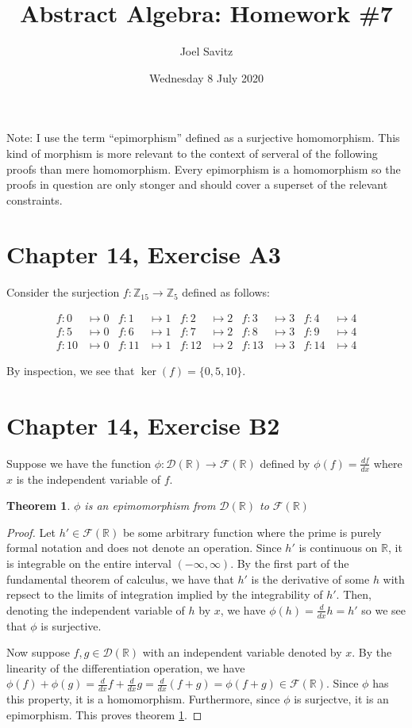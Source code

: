 \documentclass[12pt]{article}
\title{Abstract Algebra: Homework \#7}
\author{Joel Savitz}
\date{Wednesday 8 July 2020}
\newcommand{\reals}{\mathbb{R}}
\newcommand{\ints}{\mathbb{Z}}
\newcommand{\freals}{\mathcal{F}(\reals)}
\newcommand{\dreals}{\mathcal{D}(\reals)}
\newtheorem{thm}{Theorem}
\begin{document}
\maketitle

Note: I use the term ``epimorphism'' defined as a surjective homomorphism.
This kind of morphism is more relevant to the context of serveral of
the following proofs than mere homomorphism.
Every epimorphism is a homomorphism
so the proofs in question are only stonger
and should cover a superset of the relevant constraints.

\section{Chapter 14, Exercise A3}

Consider the surjection $f:\ints_{15} \to \ints_5$ defined as follows:

\begin{align*}
	f: 0 & \mapsto 0 &
	f: 1 & \mapsto 1 &
	f: 2 & \mapsto 2 &
	f: 3 & \mapsto 3 &
	f: 4 & \mapsto 4 \\
	f: 5 & \mapsto 0 &
	f: 6 & \mapsto 1 &
	f: 7 & \mapsto 2 &
	f: 8 & \mapsto 3 &
	f: 9 & \mapsto 4 \\
	f: 10 & \mapsto 0 &
	f: 11 & \mapsto 1 &
	f: 12 & \mapsto 2 &
	f: 13 & \mapsto 3 &
	f: 14 & \mapsto 4
\end{align*}

By inspection,
we see that $\ker(f) = \{0, 5, 10\}$.

\section{Chapter 14, Exercise B2}

Suppose we have
the function $\phi: \dreals \to \freals$
defined by $\phi(f) = \frac{df}{dx}$
where $x$ is the independent variable of $f$.

\begin{thm} \label{thm1}
	$\phi$ is an epimomorphism from $\dreals$ to $\freals$
\end{thm}

\begin{proof}
	Let $h' \in \freals$ be some arbitrary
	function where the prime is purely formal
	notation and does not denote an operation.
	Since $h'$ is continuous on $\reals$,
	it is integrable on the entire interval $(-\infty, \infty)$.
	By the first part of
	the fundamental theorem of calculus,
	we have that $h'$ is the derivative
	of some $h$ with repsect to the limits of integration
	implied by the integrability of $h'$.
	Then, denoting the independent variable of $h$ by $x$,
	we have $\phi(h) = \frac{d}{dx}h = h'$
	so we see that $\phi$ is surjective.

	Now suppose $f,g \in \dreals$
	with an independent variable denoted by $x$.
	By the linearity of
	the differentiation operation,
	we have $\phi(f) + \phi(g) =
	\frac{d}{dx}f + \frac{d}{dx}g =
	\frac{d}{dx}(f + g) = \phi(f + g) \in \freals$.
	Since $\phi$ has this property,
	it is a homomorphism.
	Furthermore, since $\phi$ is surjectve,
	it is an epimorphism.
	This proves theorem \ref{thm1}.
\end{proof}
\end{document}
